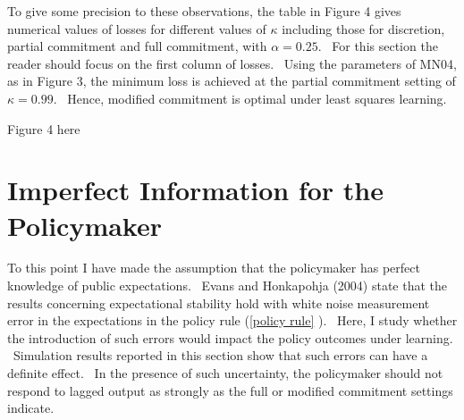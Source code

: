 \documentclass{article}
\begin{document}
\begin{doublespace}
To give some precision to these observations, the table in Figure 4 gives
numerical values of losses for different values of $\kappa $ including those
for discretion, partial commitment and full commitment, with $\alpha =0.25$.
\ For this section the reader should focus on the first column of losses. \
Using the parameters of MN04, as in Figure 3, the minimum loss is achieved
at the partial commitment setting of $\kappa =0.99$. \ Hence, modified
commitment is optimal under least squares learning.

\begin{center}
Figure 4 here
\end{center}

\section{Imperfect Information for the Policymaker}

To this point I have made the assumption that the policymaker has perfect
knowledge of public expectations. \ Evans and Honkapohja (2004) state that
the results concerning expectational stability hold with white noise
measurement error in the expectations in the policy rule (\ref{policy rule}%
). \ Here, I study whether the introduction of such errors would impact the
policy outcomes under learning. \ Simulation results reported in this
section show that such errors can have a definite effect. \ In the presence
of such uncertainty, the policymaker should not respond to lagged output as
strongly as the full or modified commitment settings indicate.


\end{doublespace}
\end{document}
